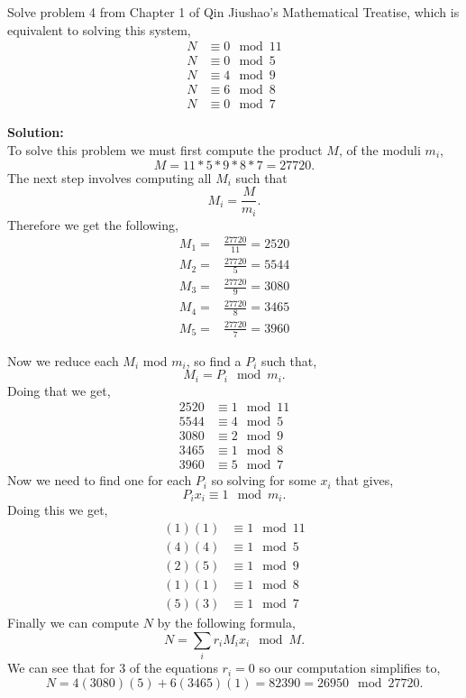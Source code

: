 \documentclass[12pt]{article}
\makeatletter
\theoremstyle{homework}
\newenvironment{exercise}[1]
{\def\@currentlabel{#1}\exercisecore}
{\endexercisecore}
\newcommand{\localhead}[1]{\par\smallskip\noindent\textbf{#1}\nobreak\\}%
\newcommand\solution{\localhead{Solution:}}
\makeatother
\begin{document}
\begin{exercise}{2} Solve problem 4 from Chapter 1 of Qin Jiushao's Mathematical Treatise, which is equivalent to 
  solving this system, 
  \begin{align*}
    N &\equiv 0 \mod 11\\
    N &\equiv 0 \mod 5\\
    N &\equiv 4 \mod 9\\
    N &\equiv 6 \mod 8\\
    N &\equiv 0 \mod 7
  \end{align*}
  
  \solution To solve this problem we must first compute the product $M$, of the moduli $m_i$,
  \begin{equation*}
    M = 11*5*9*8*7 = 27720.
  \end{equation*}
  The next step involves computing all $M_i$ such that 
  \begin{equation*}
    M_i = \frac{M}{m_i}.
  \end{equation*}
  Therefore we get the following, 
\begin{align*}
  M_1 = &\frac{27720}{11} = 2520 \\
  M_2 = &\frac{27720}{5} =5544 \\
  M_3 = &\frac{27720}{9} =3080 \\
  M_4 = &\frac{27720}{8} =3465 \\
  M_5 = &\frac{27720}{7} =3960
\end{align*}

Now we reduce each $M_i$ mod $m_i$, so find a $P_i$ such that, 
\begin{equation*}
  M_i = P_i \mod m_i.
\end{equation*}
Doing that we get,
\begin{align*}
  2520 &\equiv 1 \mod 11\\
  5544 &\equiv 4 \mod 5\\
  3080 &\equiv 2 \mod 9\\
  3465 &\equiv 1 \mod 8\\
  3960 &\equiv 5 \mod 7
\end{align*}
Now we need to find one for each $P_i$ so solving for some $x_i$ that gives, 
\begin{equation*}
  P_ix_i \equiv 1 \mod m_i.
\end{equation*}
 Doing this we get, 
\begin{align*}
 (1)(1) &\equiv 1 \mod 11\\
 (4)(4) &\equiv 1 \mod 5\\
 (2)(5) &\equiv 1 \mod 9\\
 (1)(1) &\equiv 1 \mod 8\\
 (5)(3) &\equiv 1 \mod 7
\end{align*}
Finally we can compute $N$ by the following formula, 
\begin{equation*}
  N = \sum_{i}r_iM_ix_i \mod M.
\end{equation*}
We can see that for 3 of the equations $r_i = 0$ so our computation simplifies to,
\begin{equation*}
  N = 4(3080)(5) + 6(3465)(1) = 82390 = 26950 \mod 27720.
\end{equation*}
\end{exercise}
\end{document}
